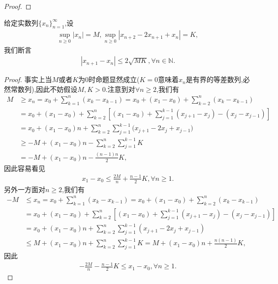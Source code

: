 \documentclass[../../main.tex]{subfiles}
\begin{document}
\begin{proof}
\end{proof}

\begin{proposition}[数列内插]\label{proposition:数列内插}
给定实数列$\{x_n\}_{n=1}^\infty$,设
\begin{align*}
\sup_{n \geqslant 0} |x_n| = M, \sup_{n \geqslant 0} |x_{n+2} - 2x_{n+1} + x_n| = K,
\end{align*}
我们断言
\begin{align*}
|x_{n+1} - x_n| \leqslant 2\sqrt{MK}, \forall n \in \mathbb{N}.
\end{align*}
\end{proposition}
\begin{proof}
事实上当$M$或者$K$为0时命题显然成立($K=0$意味着$x_n$是有界的等差数列,必然常数列),因此不妨假设$M,K>0$.注意到对$\forall n \geqslant 2$,我们有
\begin{align*}
M&\geqslant x_n=x_0+\sum_{k=1}^n{\left( x_k-x_{k-1} \right)}=x_0+\left( x_1-x_0 \right) +\sum_{k=2}^n{\left( x_k-x_{k-1} \right)}
\\
&=x_0+\left( x_1-x_0 \right) +\sum_{k=2}^n{\left[ \left( x_1-x_0 \right) +\sum_{j=1}^{k-1}{\left( x_{j+1}-x_j \right) -\left( x_j-x_{j-1} \right)} \right]}
\\
&=x_0+(x_1-x_0)n+\sum_{k=2}^n{\sum_{j=1}^{k-1}{(x_{j+1}}}-2x_j+x_{j-1})
\\
&\geqslant -M+(x_1-x_0)n-\sum_{k=2}^n{\sum_{j=1}^{k-1}{K}}
\\
&=-M+(x_1-x_0)n-\frac{(n-1)n}{2}K,
\end{align*}
因此容易看见
\begin{align*}
x_1 - x_0 \leqslant \frac{2M}{n} + \frac{n-1}{2}K, \forall n \geqslant 1.
\end{align*}
另外一方面对$n \geqslant 2$,我们有
\begin{align*}
-M&\leqslant x_n=x_0+\sum_{k=1}^n{\left( x_k-x_{k-1} \right)}=x_0+\left( x_1-x_0 \right) +\sum_{k=2}^n{\left( x_k-x_{k-1} \right)}
\\
&=x_0+\left( x_1-x_0 \right) +\sum_{k=2}^n{\left[ \left( x_1-x_0 \right) +\sum_{j=1}^{k-1}{\left( x_{j+1}-x_j \right) -\left( x_j-x_{j-1} \right)} \right]}
\\
&=x_0+(x_1-x_0)n+\sum_{k=2}^n{\sum_{j=1}^{k-1}{(x_{j+1}-2x_j+x_{j-1})}}
\\
&\leqslant M+(x_1-x_0)n+\sum_{k=2}^n{\sum_{j=1}^{k-1}{K=M}}+(x_1-x_0)n+\frac{n(n-1)}{2}K,
\end{align*}
因此
\begin{align*}
-\frac{2M}{n} - \frac{n-1}{2}K \leqslant x_1 - x_0, \forall n \geqslant 1.

\end{align*}
\end{proof}
\end{document}
